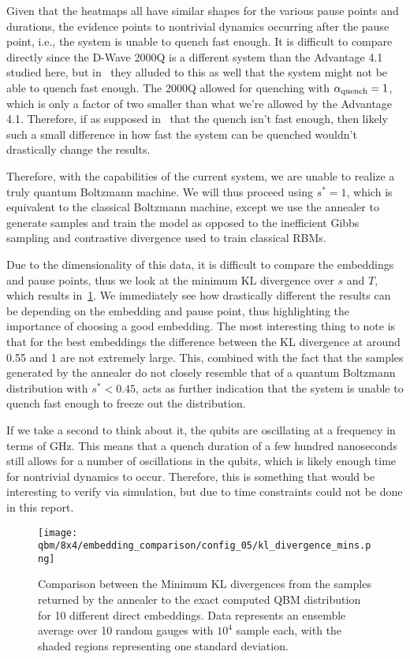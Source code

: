 Given that the heatmaps all have similar shapes for the various pause points and durations, the evidence points to nontrivial dynamics occurring after the pause point, i.e., the system is unable to quench fast enough.
It is difficult to compare directly since the D-Wave 2000Q is a different system than the Advantage 4.1 studied here, but in~\cite{marshall_2019} they alluded to this as well that the system might not be able to quench fast enough.
The 2000Q allowed for quenching with \( \alpha_{\text{quench}} = 1 \), which is only a factor of two smaller than what we're allowed by the Advantage 4.1.
Therefore, if as supposed in~\cite{marshall_2019} that the quench isn't fast enough, then likely such a small difference in how fast the system can be quenched wouldn't drastically change the results.

Therefore, with the capabilities of the current system, we are unable to realize a truly quantum Boltzmann machine.
We will thus proceed using \( s^* = 1 \), which is equivalent to the classical Boltzmann machine, except we use the annealer to generate samples and train the model as opposed to the inefficient Gibbs sampling and contrastive divergence used to train classical RBMs.

Due to the dimensionality of this data, it is difficult to compare the embeddings and pause points, thus we look at the minimum KL divergence over \( s \) and \( T \), which results in~\cref{fig:dkl_mins_embeddings}.
We immediately see how drastically different the results can be depending on the embedding and pause point, thus highlighting the importance of choosing a good embedding.
The most interesting thing to note is that for the best embeddings the difference between the KL divergence at around 0.55 and 1 are not extremely large.
This, combined with the fact that the samples generated by the annealer do not closely resemble that of a quantum Boltzmann distribution with \( s^* < 0.45 \), acts as further indication that the system is unable to quench fast enough to freeze out the distribution.

If we take a second to think about it, the qubits are oscillating at a frequency in terms of GHz.
This means that a quench duration of a few hundred nanoseconds still allows for a number of oscillations in the qubits, which is likely enough time for nontrivial dynamics to occur.
Therefore, this is something that would be interesting to verify via simulation, but due to time constraints could not be done in this report.

\begin{figure}[!htb]
    \begin{center}
        \texttt{[image: qbm/8x4/embedding\_comparison/config\_05/kl\_divergence\_mins.png]}
    \end{center}
    \caption{Comparison between the Minimum KL divergences from the samples returned by the annealer to the exact computed QBM distribution for 10 different direct embeddings. Data represents an ensemble average over 10 random gauges with \( 10^4 \) sample each, with the shaded regions representing one standard deviation.}
    \label{fig:dkl_mins_embeddings}
\end{figure}

